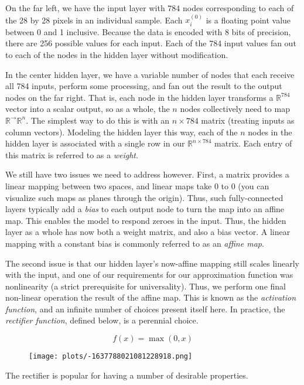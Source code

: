 \documentclass[
]{article}
\begin{document}
On the far left, we have the input layer with \(784\) nodes
corresponding to each of the 28 by 28 pixels in an individual sample.
Each \(x_i^{(0)}\) is a floating point value between 0 and 1 inclusive.
Because the data is encoded with 8 bits of precision, there are 256
possible values for each input. Each of the 784 input values fan out to
each of the nodes in the hidden layer without modification.

In the center hidden layer, we have a variable number of nodes that each
receive all 784 inputs, perform some processing, and fan out the result
to the output nodes on the far right. That is, each node in the hidden
layer transforms a \(\mathbb{R}^{784}\) vector into a scalar output, so
as a whole, the \(n\) nodes collectively need to map
\(\mathbb{R}^\rightarrow \mathbb{R}^n\). The simplest way to do this is
with an \(n\times 784\) matrix (treating inputs as column vectors).
Modeling the hidden layer this way, each of the \(n\) nodes in the
hidden layer is associated with a single row in our
\(\mathbb{R}^{n\times 784}\) matrix. Each entry of this matrix is
referred to as a \emph{weight}.

We still have two issues we need to address however. First, a matrix
provides a linear mapping between two spaces, and linear maps take \(0\)
to \(0\) (you can visualize such maps as planes through the origin).
Thus, such fully-connected layers typically add a \emph{bias} to each
output node to turn the map into an affine map. This enables the model
to respond zeroes in the input. Thus, the hidden layer as a whole has
now both a weight matrix, and also a bias vector. A linear mapping with
a constant bias is commonly referred to as an \emph{affine map}.

The second issue is that our hidden layer's now-affine mapping still
scales linearly with the input, and one of our requirements for our
approximation function was nonlinearity (a strict prerequisite for
universality). Thus, we perform one final non-linear operation the
result of the affine map. This is known as the \emph{activation
function}, and an infinite number of choices present itself here. In
practice, the \emph{rectifier function}, defined below, is a perennial
choice.

\[f(x) = \max(0, x)\]

\begin{figure}
\centering
\texttt{[image: plots/-1637788021081228918.png]}
\caption{}
\end{figure}

The rectifier is popular for having a number of desirable properties.
\end{document}
